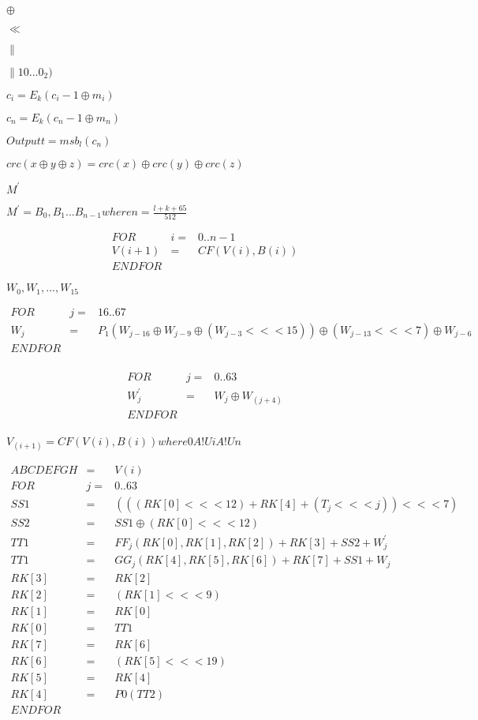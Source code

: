 \documentclass{article}
\begin{document}
$ \oplus$
\pagebreak

$ \ll $
\pagebreak

$ \parallel $
\pagebreak

$ \parallel 10...0_2) $
\pagebreak

$ c_i = E_k(c_i−1 \oplus m_i) $
\pagebreak

$ c_n = E_k(c_n−1 \oplus m_n) $
\pagebreak

$ Output t = msb_l(c_n) $
\pagebreak

$ crc(x \oplus y \oplus z) = crc(x) \oplus crc(y) \oplus crc(z) $
\pagebreak

$ {M}^{'}$
\pagebreak

$ {M}^{'} = B_0, B_1 ... B_{n-1} where n=\frac{l+k+65}{512}$
\pagebreak

\begin{eqnarray*} FOR&i=&0..n-1 \\ V(i+1) &=& CF(V(i),B(i)) \\ ENDFOR \end{eqnarray*}
\pagebreak

$ W_0, W_1, ... , W_15$
\pagebreak

\begin{eqnarray*} FOR&j=&16..67 \\ W_j &=& P_1(W_{j-16} \oplus W_{j-9} \oplus (W_{j-3} <<< 15)) \oplus (W_{j-13} <<< 7) \oplus W_{j-6} \\ ENDFOR \\ \end{eqnarray*}
\pagebreak

\begin{eqnarray*} FOR&j=&0..63 \\ {W}^{'}_j &=& W_j \oplus W_(j+4) \\ ENDFOR \\ \end{eqnarray*}
\pagebreak

$ V_(i+1) = CF(V(i),B(i)) where 0 A!U i A!U n $
\pagebreak

\begin{eqnarray*} ABCDEFGH &=& V(i) \\ FOR & j= &0..63 \\ SS1 &=& (((RK[0] <<< 12) + RK[4] + (T_j <<< j)) <<< 7) \\ SS2 &=& SS1 \oplus (RK[0] <<< 12) \\ TT1 &=& FF_j(RK[0], RK[1], RK[2]) + RK[3] + SS2 + {W}^{'}_j \\ TT1 &=& GG_j(RK[4], RK[5], RK[6]) + RK[7] + SS1 + W_j \\ RK[3] &=& RK[2] \\ RK[2] &=& (RK[1] <<< 9) \\ RK[1] &=& RK[0] \\ RK[0] &=& TT1 \\ RK[7] &=& RK[6] \\ RK[6] &=& (RK[5] <<< 19) \\ RK[5] &=& RK[4] \\ RK[4] &=& P0(TT2) \\ ENDFOR \\ \end{eqnarray*}
\pagebreak
\end{document}
